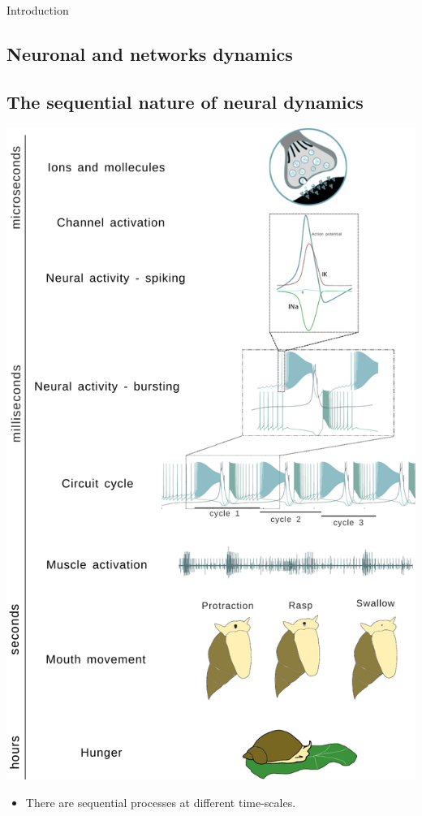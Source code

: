 \documentclass[aspectratio=43]{beamer}
\begin{document}
\begin{frame}{Introduction}
	\subsection{Neuronal and networks dynamics}
	
	\subsection{The sequential nature of neural dynamics}
	\begin{minipage}[b]{0.5\textwidth}
		\includegraphics[width=\textwidth]{intro/time scale/time-scale-feeding.pdf}
	\end{minipage}
	\begin{minipage}[b]{0.4\textwidth}
		\begin{itemize}
			\item There are sequential processes at different time-scales.
		\end{itemize}
	\end{minipage}
	

\end{frame}
\end{document}
